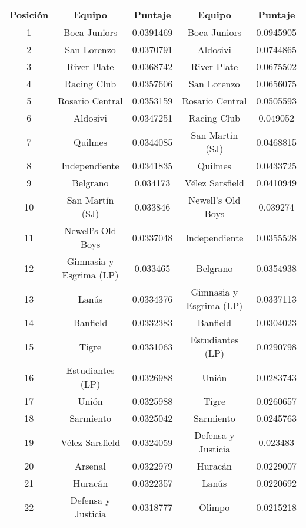 \begin{table}[H]
\begin{flushright}
	\begin{tabular}{| c | c | c || c | c |}
	  	\hline
	  	\rowcolor{LightCyan}
	  	Posición & Equipo & Puntaje & Equipo & Puntaje \\ \hline \hline
		1 & Boca Juniors & 0.0391469 & Boca Juniors & 0.0945905 \\ \hline
		2 & San Lorenzo & 0.0370791 & \cellcolor{green!20}Aldosivi & 0.0744865 \\ \hline
		3 & River Plate & 0.0368742 & River Plate & 0.0675502 \\ \hline
		4 & Racing Club & 0.0357606 & San Lorenzo & 0.0656075 \\ \hline
		5 & Rosario Central & 0.0353159 & Rosario Central & 0.0505593 \\ \hline
		6 & \cellcolor{green!20}Aldosivi & 0.0347251 & Racing Club & 0.049052 \\ \hline
		7 & Quilmes & 0.0344085 & San Martín (SJ) & 0.0468815 \\ \hline
		8 & Independiente & 0.0341835 & Quilmes & 0.0433725 \\ \hline
		9 & Belgrano & 0.034173 & \cellcolor{blue!20}Vélez Sarsfield & 0.0410949 \\ \hline
		10 & San Martín (SJ) & 0.033846 & Newell's Old Boys & 0.039274 \\ \hline
		11 & Newell's Old Boys & 0.0337048 & Independiente & 0.0355528 \\ \hline
		12 & Gimnasia y Esgrima (LP) & 0.033465 & Belgrano & 0.0354938 \\ \hline
		13 & Lanús & 0.0334376 & Gimnasia y Esgrima (LP) & 0.0337113 \\ \hline
		14 & Banfield & 0.0332383  & Banfield & 0.0304023 \\ \hline
		15 & Tigre & 0.0331063 & Estudiantes (LP) & 0.0290798 \\ \hline
		16 & Estudiantes (LP) & 0.0326988 & Unión & 0.0283743 \\ \hline
		17 & Unión & 0.0325988 & Tigre & 0.0260657 \\ \hline
		18 & Sarmiento & 0.0325042 & Sarmiento & 0.0245763 \\ \hline
		19 & \cellcolor{blue!20}Vélez Sarsfield & 0.0324059 & Defensa y Justicia & 0.023483 \\ \hline
		20 & Arsenal & 0.0322979 & Huracán & 0.0229007 \\ \hline
		21 & Huracán & 0.0322357 & Lanús & 0.0220692 \\ \hline
		22 & Defensa y Justicia & 0.0318777 & Olimpo & 0.0215218 \\ \hline

\end{tabular}
\end{flushright}
\end{table}
